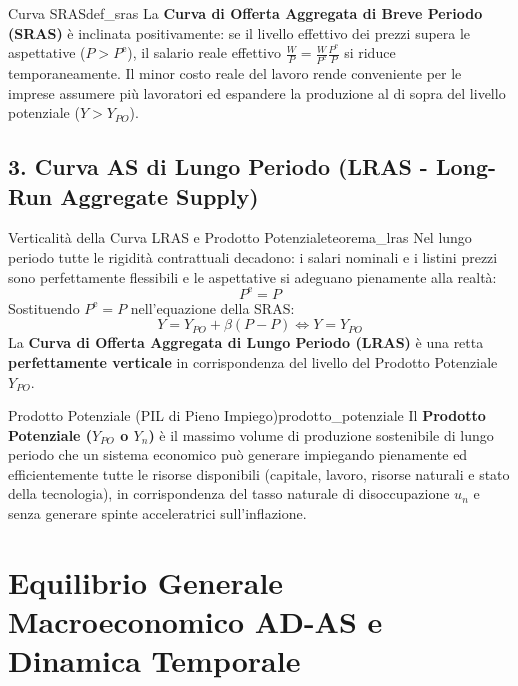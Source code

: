 \begin{definizione}{Curva SRAS}{def_sras}
La \textbf{Curva di Offerta Aggregata di Breve Periodo (SRAS)} è inclinata positivamente: se il livello effettivo dei prezzi supera le aspettative ($P > P^{\mathrm{e}}$), il salario reale effettivo $\frac{W}{P} = \frac{W}{P^{\mathrm{e}}} \frac{P^{\mathrm{e}}}{P}$ si riduce temporaneamente. Il minor costo reale del lavoro rende conveniente per le imprese assumere più lavoratori ed espandere la produzione al di sopra del livello potenziale ($Y > Y_{PO}$).
\end{definizione}

\subsection{3. Curva AS di Lungo Periodo (LRAS - Long-Run Aggregate Supply)}

\begin{teorema}{Verticalità della Curva LRAS e Prodotto Potenziale}{teorema_lras}
Nel lungo periodo tutte le rigidità contrattuali decadono: i salari nominali e i listini prezzi sono perfettamente flessibili e le aspettative si adeguano pienamente alla realtà:
\begin{equation}
    P^{\mathrm{e}} = P
\end{equation}
Sostituendo $P^{\mathrm{e}} = P$ nell'equazione della SRAS:
\begin{equation}
    Y = Y_{PO} + \beta(P - P) \iff Y = Y_{PO} \label{eq:lras}
\end{equation}
La \textbf{Curva di Offerta Aggregata di Lungo Periodo (LRAS)} è una retta \textbf{perfettamente verticale} in corrispondenza del livello del Prodotto Potenziale $Y_{PO}$.
\end{teorema}

\begin{definizione}{Prodotto Potenziale (PIL di Pieno Impiego)}{prodotto_potenziale}
Il \textbf{Prodotto Potenziale ($Y_{PO}$ o $Y_n$)} è il massimo volume di produzione sostenibile di lungo periodo che un sistema economico può generare impiegando pienamente ed efficientemente tutte le risorse disponibili (capitale, lavoro, risorse naturali e stato della tecnologia), in corrispondenza del tasso naturale di disoccupazione $u_n$ e senza generare spinte acceleratrici sull'inflazione.
\end{definizione}

\section{Equilibrio Generale Macroeconomico AD-AS e Dinamica Temporale}

